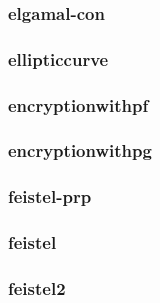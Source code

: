 \begin{frame}\frametitle{elgamal-con}
\begin{figure}
\begin{center}

\end{center}
\end{figure}
\end{frame}
\begin{frame}\frametitle{ellipticcurve}
\begin{figure}
\begin{center}

\end{center}
\end{figure}
\end{frame}
\begin{frame}\frametitle{encryptionwithpf}
\begin{figure}
\begin{center}

\end{center}
\end{figure}
\end{frame}
\begin{frame}\frametitle{encryptionwithpg}
\begin{figure}
\begin{center}

\end{center}
\end{figure}
\end{frame}
\begin{frame}\frametitle{feistel-prp}
\begin{figure}
\begin{center}

\end{center}
\end{figure}
\end{frame}
\begin{frame}\frametitle{feistel}
\begin{figure}
\begin{center}

\end{center}
\end{figure}
\end{frame}
\begin{frame}\frametitle{feistel2}
\begin{figure}
\begin{center}

\end{center}
\end{figure}
\end{frame}
